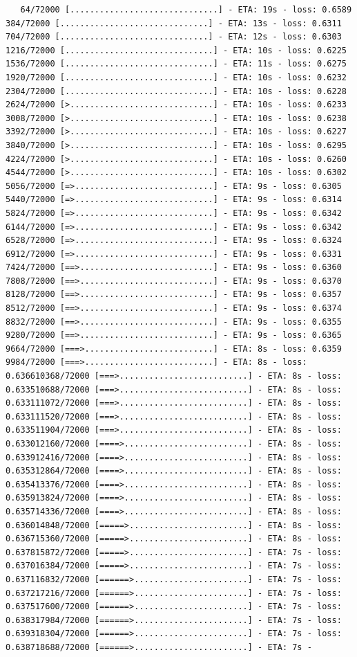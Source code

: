 \documentclass[12pt,fleqn]{article}\usepackage{../../common}
\begin{document}
\begin{verbatim}
   64/72000 [..............................] - ETA: 19s - loss: 0.6589  384/72000 [..............................] - ETA: 13s - loss: 0.6311  704/72000 [..............................] - ETA: 12s - loss: 0.6303 1216/72000 [..............................] - ETA: 10s - loss: 0.6225 1536/72000 [..............................] - ETA: 11s - loss: 0.6275 1920/72000 [..............................] - ETA: 10s - loss: 0.6232 2304/72000 [..............................] - ETA: 10s - loss: 0.6228 2624/72000 [>.............................] - ETA: 10s - loss: 0.6233 3008/72000 [>.............................] - ETA: 10s - loss: 0.6238 3392/72000 [>.............................] - ETA: 10s - loss: 0.6227 3840/72000 [>.............................] - ETA: 10s - loss: 0.6295 4224/72000 [>.............................] - ETA: 10s - loss: 0.6260 4544/72000 [>.............................] - ETA: 10s - loss: 0.6302 5056/72000 [=>............................] - ETA: 9s - loss: 0.6305  5440/72000 [=>............................] - ETA: 9s - loss: 0.6314 5824/72000 [=>............................] - ETA: 9s - loss: 0.6342 6144/72000 [=>............................] - ETA: 9s - loss: 0.6342 6528/72000 [=>............................] - ETA: 9s - loss: 0.6324 6912/72000 [=>............................] - ETA: 9s - loss: 0.6331 7424/72000 [==>...........................] - ETA: 9s - loss: 0.6360 7808/72000 [==>...........................] - ETA: 9s - loss: 0.6370 8128/72000 [==>...........................] - ETA: 9s - loss: 0.6357 8512/72000 [==>...........................] - ETA: 9s - loss: 0.6374 8832/72000 [==>...........................] - ETA: 9s - loss: 0.6355 9280/72000 [==>...........................] - ETA: 9s - loss: 0.6365 9664/72000 [===>..........................] - ETA: 8s - loss: 0.6359 9984/72000 [===>..........................] - ETA: 8s - loss: 0.636610368/72000 [===>..........................] - ETA: 8s - loss: 0.633510688/72000 [===>..........................] - ETA: 8s - loss: 0.633111072/72000 [===>..........................] - ETA: 8s - loss: 0.633111520/72000 [===>..........................] - ETA: 8s - loss: 0.633511904/72000 [===>..........................] - ETA: 8s - loss: 0.633012160/72000 [====>.........................] - ETA: 8s - loss: 0.633912416/72000 [====>.........................] - ETA: 8s - loss: 0.635312864/72000 [====>.........................] - ETA: 8s - loss: 0.635413376/72000 [====>.........................] - ETA: 8s - loss: 0.635913824/72000 [====>.........................] - ETA: 8s - loss: 0.635714336/72000 [====>.........................] - ETA: 8s - loss: 0.636014848/72000 [=====>........................] - ETA: 8s - loss: 0.636715360/72000 [=====>........................] - ETA: 8s - loss: 0.637815872/72000 [=====>........................] - ETA: 7s - loss: 0.637016384/72000 [=====>........................] - ETA: 7s - loss: 0.637116832/72000 [======>.......................] - ETA: 7s - loss: 0.637217216/72000 [======>.......................] - ETA: 7s - loss: 0.637517600/72000 [======>.......................] - ETA: 7s - loss: 0.638317984/72000 [======>.......................] - ETA: 7s - loss: 0.639318304/72000 [======>.......................] - ETA: 7s - loss: 0.638718688/72000 [======>.......................] - ETA: 7s - 
\end{verbatim}
\end{document}
